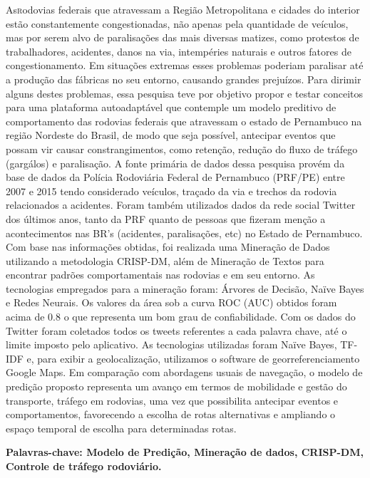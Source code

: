 \vspace*{12pt}

\lettrine {As} rodovias federais que atravessam a Região
Metropolitana e cidades do interior estão constantemente
congestionadas, não apenas pela quantidade de veículos,
mas por serem alvo de paralisações das mais diversas
matizes, como protestos de trabalhadores, acidentes,
danos na via, intempéries naturais e outros fatores de
congestionamento. Em situações extremas esses problemas
poderiam paralisar até a produção das fábricas no seu
entorno, causando grandes prejuízos. Para dirimir alguns
destes problemas, essa pesquisa teve por objetivo propor e testar conceitos 
para uma plataforma autoadaptável que contemple um modelo preditivo de comportamento das rodovias federais que
atravessam o estado de Pernambuco na região Nordeste do
Brasil, de modo que seja possível, antecipar eventos que
possam vir causar constrangimentos, como retenção, redução do fluxo de tráfego (gargálos) e paralisação. A fonte primária de dados
dessa pesquisa provém da base de dados da Polícia 
Rodoviária Federal de Pernambuco (PRF/PE) entre 2007 e 2015 tendo considerado veículos, traçado da via e trechos da
rodovia relacionados a acidentes. Foram também utilizados dados da rede social Twitter dos últimos anos, tanto da PRF quanto de 
pessoas que fizeram menção a acontecimentos nas BR's (acidentes, paralisações, etc) no Estado de Pernambuco. 
Com base nas informações obtidas, foi realizada uma Mineração de Dados utilizando a metodologia CRISP-DM, além de Mineração de Textos para encontrar padrões comportamentais nas rodovias e em seu
entorno. As tecnologias empregados para a mineração foram: Árvores de Decisão, Naïve Bayes e Redes Neurais. 
Os valores da área sob a curva ROC (AUC) obtidos foram
acima de 0.8 o que representa um bom grau de confiabilidade. Com os dados do Twitter foram coletados todos os tweets referentes a cada palavra chave, até o limite imposto pelo aplicativo. As tecnologias utilizadas foram Naïve Bayes, TF-IDF e, para exibir a geolocalização, utilizamos o software de georreferenciamento Google Maps.
Em comparação com abordagens usuais de navegação, o
modelo de predição proposto representa um avanço em
termos de mobilidade e gestão do transporte, tráfego em rodovias, uma vez que possibilita antecipar eventos e
comportamentos, favorecendo a escolha de rotas alternativas e ampliando o espaço temporal de escolha para determinadas rotas. 


\par
\vspace{2em}
\noindent\textbf{Palavras-chave: Modelo de Predição, Mineração de dados, CRISP-DM, Controle de tráfego rodoviário.}